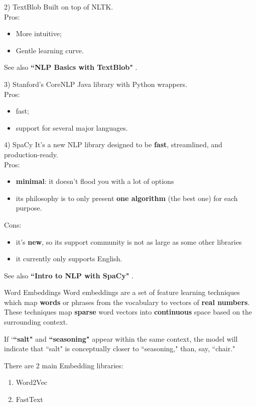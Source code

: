 \documentclass[xcolor=dvipsnames]{beamer}
\begin{document}
\begin{frame}{2) TextBlob}
Built on top of NLTK.\\
Pros:
\begin{itemize}
\item More intuitive;
\item Gentle learning curve.
\end{itemize}
See also \textbf{``NLP Basics with TextBlob"} \cite{p7}.
\end{frame}

\begin{frame}{3) Stanford's CoreNLP}
Java library with Python wrappers.\\
Pros: 
\begin{itemize}
\item fast;
\item support for several major languages.
\end{itemize}
\end{frame}

\begin{frame}{4) SpaCy}
It's a new NLP library  designed to be \textbf{fast}, streamlined, and production-ready.\\
Pros:
\begin{itemize}
\item \textbf{minimal}: it doesn't flood you with a lot of options
\item its philosophy is to only present \textbf{one algorithm} (the best one) for each purpose.
\end{itemize}
Cons:
\begin{itemize}
\item it's \textbf{new}, so its support community is not as large as some other libraries
\item it currently only supports English.
\end{itemize}
See also \textbf{``Intro to NLP with SpaCy"} \cite{p8}. 
\end{frame}

\begin{frame}{Word Embeddings}
Word embeddings are a set of feature learning techniques which map \textbf{words} or phrases from the vocabulary to vectors of \textbf{real numbers}. \\
These techniques map \textbf{sparse} word vectors into \textbf{continuous} space based on the surrounding context.\\
\begin{Example}
If `\textbf{``salt"} and \textbf{``seasoning"} appear within the same context, the model will indicate that ``salt" is conceptually closer to ``seasoning," than, say, ``chair." 
\end{Example}
There are 2 main Embedding libraries:
\begin{enumerate}
\item Word2Vec
\item FastText
\end{enumerate}
\end{frame}
\end{document}

